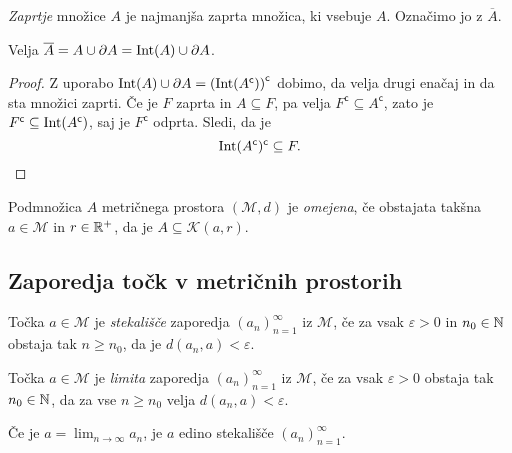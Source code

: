 \documentclass[12pt, a4paper]{article}
\begin{document}
\obvs

\begin{definicija}
\emph{Zaprtje} množice $A$ je najmanjša zaprta množica, ki vsebuje $A$. Označimo jo z $\overline{A}$.
\end{definicija}

\begin{trditev}
Velja $\overline{A}=A\cup\partial A=\operatorname{Int}(A)\cup\partial A$.
\end{trditev}

\begin{proof}
Z uporabo $\operatorname{Int}(A)\cup\partial A=\left(\operatorname{Int}(A^\mathsf{c})\right)^\mathsf{c}$ dobimo, da velja drugi enačaj in da sta množici zaprti. Če je $F$ zaprta in $A\subseteq F$, pa velja $F^\mathsf{c}\subseteq A^\mathsf{c}$, zato je $F^\mathsf{c}\subseteq\operatorname{Int}(A^\mathsf{c})$, saj je $F^\mathsf{c}$ odprta. Sledi, da je
\[
\operatorname{Int}(A^\mathsf{c})^\mathsf{c}\subseteq F.\qedhere
\]
\end{proof}

\begin{definicija}
Podmnožica $A$ metričnega prostora $(\mathcal{M},d)$ je \emph{omejena}, če obstajata takšna $a\in \mathcal{M}$ in $r\in\mathbb{R}^+$, da je $A\subseteq\mathcal{K}(a,r)$.
\end{definicija}

\newpage

\subsection{Zaporedja točk v metričnih prostorih}

\begin{definicija}
Točka $a\in \mathcal{M}$ je \emph{stekališče} zaporedja $(a_n)_{n=1}^\infty$ iz $\mathcal{M}$, če za vsak $\varepsilon>0$ in $n_0\in\mathbb{N}$ obstaja tak $n\geq n_0$, da je $d(a_n,a)<\varepsilon$.
\end{definicija}

\begin{definicija}
Točka $a\in \mathcal{M}$ je \emph{limita} zaporedja $(a_n)_{n=1}^\infty$ iz $\mathcal{M}$, če za vsak $\varepsilon>0$ obstaja tak $n_0\in\mathbb{N}$, da za vse $n\geq n_0$ velja $d(a_n,a)<\varepsilon$.
\end{definicija}

\begin{trditev}
Če je $a=\displaystyle\lim_{n\to\infty}a_n$, je $a$ edino stekališče $(a_n)_{n=1}^\infty$.
\end{trditev}
\end{document}
